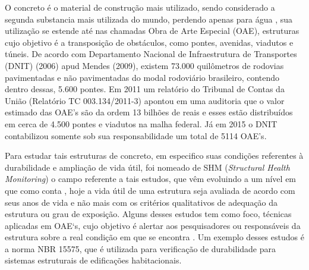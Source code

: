 O concreto é o material de construção mais utilizado, sendo considerado a segunda substancia mais utilizada do mundo, perdendo apenas para água \cite{Gagg2014}, sua utilização se estende até nas chamadas Obra de Arte Especial (OAE), estruturas cujo objetivo é a transposição de obstáculos, como pontes, avenidas, viadutos e túneis. De acordo com Departamento Nacional de Infraestrutura de Transportes (DNIT) (2006) apud Mendes (2009), existem 73.000 quilômetros de rodovias pavimentadas e não pavimentadas do modal rodoviário brasileiro, contendo dentro dessas, 5.600 pontes. Em 2011 um relatório do Tribunal de Contas da União (Relatório TC 003.134/2011-3) apontou em uma auditoria que o valor estimado das OAE's são da ordem 13 bilhões de reais e esses estão distribuídos em cerca de 4.500 pontes e viadutos na malha federal. Já em 2015 o DNIT contabilizou somente sob sua responsabilidade um total de 5114 OAE’s.

Para estudar tais estruturas de concreto, em especifico suas condições referentes à durabilidade e ampliação de vida útil, foi nomeado de SHM (\textit{Structural Health Monitoring}) o campo referente a tais estudos, que vêm evoluindo a um nível em que como conta , hoje a vida útil de uma estrutura seja avaliada de acordo com seus anos de vida e não mais com os critérios qualitativos de adequação da estrutura ou grau de exposição. Alguns desses estudos tem como foco, técnicas aplicadas em OAE`s, cujo objetivo é alertar aos pesquisadores ou responsáveis da estrutura sobre a real condição em que se encontra \cite{inaudi2009structural}. Um exemplo desses estudos é a norma NBR 15575, que é utilizada para verificação de durabilidade para sistemas estruturais de edificações habitacionais.






